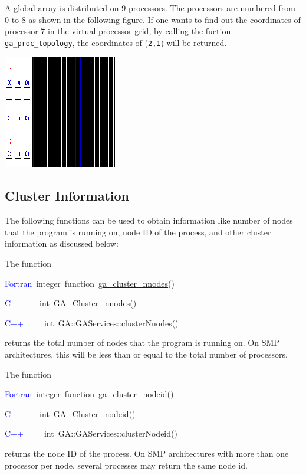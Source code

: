 \textit{\textcolor{black}{}}\textit{\textcolor{black}{{}
}}A global array is distributed on 9 processors. The processors are
numbered from 0 to 8 as shown in the following figure. If one wants
to find out the coordinates of processor 7 in the virtual processor
grid, by calling the fuction \texttt{ga\_proc\_topology}, the coordinates
of (\texttt{2,1}) will be returned.

\includegraphics{topo}


\subsection{Cluster Information }

The following functions can be used to obtain information like number
of nodes that the program is running on, node ID of the process, and
other cluster information as discussed below:

The function
\begin{lyxcode}
\textcolor{blue}{Fortran}~integer~function~\href{http://www.emsl.pnl.gov/docs/global/ga_ops.html\#ga_cluster_nnodes}{ga\_{}cluster\_{}nnodes}()~

\textcolor{blue}{C}~~~~~~~int~\href{http://www.emsl.pnl.gov/docs/global/c_nga_ops.html\#ga_cluster_nnodes}{GA\_{}Cluster\_{}nnodes}()~

\textcolor{blue}{C++}~~~~~int~GA::GAServices::clusterNnodes()
\end{lyxcode}
returns the total number of nodes that the program is running on.
On SMP architectures, this will be less than or equal to the total
number of processors.

The function
\begin{lyxcode}
\textcolor{blue}{Fortran}~integer~function~\href{http://www.emsl.pnl.gov/docs/global/ga_ops.html\#ga_cluster_nodeid}{ga\_{}cluster\_{}nodeid}()~

\textcolor{blue}{C}~~~~~~~int~\href{http://www.emsl.pnl.gov/docs/global/c_nga_ops.html\#ga_cluster_nodeid}{GA\_{}Cluster\_{}nodeid}()~

\textcolor{blue}{C++}~~~~~int~GA::GAServices::clusterNodeid()
\end{lyxcode}
returns the node ID of the process. On SMP architectures with more
than one processor per node, several processes may return the same
node id.

